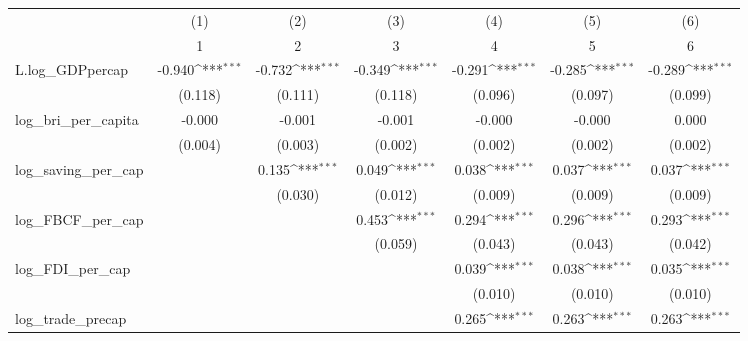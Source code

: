 {
\def\sym#1{\ifmmode^{#1}\else\(^{#1}\)\fi}
\begin{tabular}{l*{6}{c}}
\toprule
            &\multicolumn{1}{c}{(1)}&\multicolumn{1}{c}{(2)}&\multicolumn{1}{c}{(3)}&\multicolumn{1}{c}{(4)}&\multicolumn{1}{c}{(5)}&\multicolumn{1}{c}{(6)}\\
            &\multicolumn{1}{c}{1}&\multicolumn{1}{c}{2}&\multicolumn{1}{c}{3}&\multicolumn{1}{c}{4}&\multicolumn{1}{c}{5}&\multicolumn{1}{c}{6}\\
\midrule
L.log\_GDPpercap&      -0.940\sym{***}&      -0.732\sym{***}&      -0.349\sym{***}&      -0.291\sym{***}&      -0.285\sym{***}&      -0.289\sym{***}\\
            &     (0.118)         &     (0.111)         &     (0.118)         &     (0.096)         &     (0.097)         &     (0.099)         \\
\addlinespace
log\_bri\_per\_capita&      -0.000         &      -0.001         &      -0.001         &      -0.000         &      -0.000         &       0.000         \\
            &     (0.004)         &     (0.003)         &     (0.002)         &     (0.002)         &     (0.002)         &     (0.002)         \\
\addlinespace
log\_saving\_per\_cap&                     &       0.135\sym{***}&       0.049\sym{***}&       0.038\sym{***}&       0.037\sym{***}&       0.037\sym{***}\\
            &                     &     (0.030)         &     (0.012)         &     (0.009)         &     (0.009)         &     (0.009)         \\
\addlinespace
log\_FBCF\_per\_cap&                     &                     &       0.453\sym{***}&       0.294\sym{***}&       0.296\sym{***}&       0.293\sym{***}\\
            &                     &                     &     (0.059)         &     (0.043)         &     (0.043)         &     (0.042)         \\
\addlinespace
log\_FDI\_per\_cap&                     &                     &                     &       0.039\sym{***}&       0.038\sym{***}&       0.035\sym{***}\\
            &                     &                     &                     &     (0.010)         &     (0.010)         &     (0.010)         \\
\addlinespace
log\_trade\_precap&                     &                     &                     &       0.265\sym{***}&       0.263\sym{***}&       0.263\sym{***}\\

\end{tabular}}
